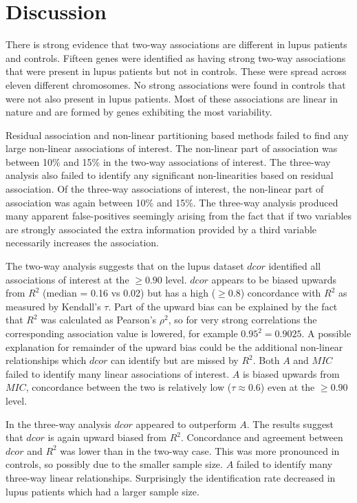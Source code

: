 \documentclass[a4paper, 12pt]{report}
\begin{document}
\section{Discussion}
There is strong evidence that two-way associations are different in lupus patients and controls. Fifteen genes were identified as having strong two-way associations that were present in lupus patients but not in controls. These were spread across eleven different chromosomes. No strong associations were found in controls that were not also present in lupus patients. Most of these associations are linear in nature and are formed by genes exhibiting the most variability. 

Residual association and non-linear partitioning based methods failed to find any large non-linear associations of interest. The non-linear part of association was between 10\% and 15\% in the two-way associations of interest. The three-way analysis also failed to identify any significant non-linearities based on residual association. Of the three-way associations of interest, the non-linear part of association was again between 10\% and 15\%. The three-way analysis produced many apparent false-positives seemingly arising from the fact that if two variables are strongly associated the extra information provided by a third variable necessarily increases the association.

The two-way analysis suggests that on the lupus dataset $dcor$ identified all associations of interest at the $\ge 0.90$ level.  $dcor$ appears to be biased upwards from $R^2$ (median = 0.16 vs 0.02) but has a high ($\ge 0.8$) concordance with $R^2$ as measured by Kendall's $\tau$. Part of the upward bias can be explained by the fact that $R^2$ was calculated as Pearson's $\rho^2$, so for very strong correlations the corresponding association value is lowered, for example $0.95^2 = 0.9025$. A possible explanation for remainder of the upward bias could be the additional non-linear relationships which $dcor$ can identify but are missed by $R^2$. Both $A$ and $MIC$ failed to identify many linear associations of interest. $A$ is biased upwards from $MIC$, concordance between the two is relatively low ($\tau \approx 0.6$) even at the $\ge0.90$ level.

In the three-way analysis $dcor$ appeared to outperform $A$. The results suggest that $dcor$ is again upward biased from $R^2$. Concordance and agreement between $dcor$ and $R^2$ was lower than in the two-way case. This was more pronounced in controls, so possibly due to the smaller sample size. $A$ failed to identify many three-way linear relationships. Surprisingly the identification rate decreased in lupus patients which had a larger sample size.  
\end{document}
